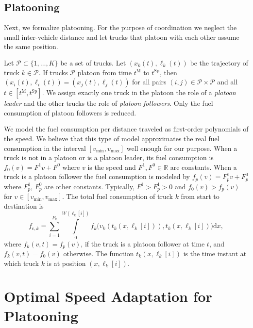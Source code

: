 \documentclass[letterpaper,10pt,conference,twocolumn]{IEEEtran}
\newcommand{\set}[1]{\mathcal{#1}}
\newcommand{\op}[1]{\mathrm{#1}}
\theoremstyle{definition}
\begin{document}
\subsection*{Platooning}

Next, we formalize platooning. For the purpose of coordination we neglect the small inter-vehicle distance and let trucks that platoon with each other assume the same position.

Let $\set{P} \subset \{1,\dots,K\}$ be a set of trucks. Let $(x_k(t),\ell_k(t))$ be the trajectory of truck $k \in \set{P}$. If trucks $\set{P}$ platoon from time $t^\op{M}$ to $t^\op{Sp}$, then $(x_i(t),\ell_i(t)) = (x_j(t),\ell_j(t))$ for all pairs $(i,j) \in \set{P}\times\set{P}$ and all $t \in [t^\op{M},t^\op{Sp}]$. 
We assign exactly one truck in the platoon the role of a \textit{platoon leader} and the other trucks the role of \textit{platoon followers}. Only the fuel consumption of platoon followers is reduced.

We model the fuel consumption per distance traveled as first-order polynomials of the speed.
We believe that this type of model approximates the real fuel consumption in the interval $[v_{\min}, v_{\max}]$ well enough for our purpose.
When a truck is not in a platoon or is a platoon leader, its fuel consumption is $f_0(v) = F^1 v + F^0$ where $v$ is the speed and $F^1, F^0 \in \mathbb{R}$ are constants. When a truck is a platoon follower the fuel consumption is modeled by $f_p(v) = F_p^1 v + F_p^0$ where $F_p^1$, $F_p^0$ are other constants. Typically, $F^1 > F_p^1 > 0$ and $f_0(v) > f_p(v)$ for $v \in [v_{\min}, v_{\max}]$.
The total fuel consumption of truck $k$ from start to destination is
\begin{equation}
 f_{\op{c},k} = \sum\limits_{i = 1}^{P_k} \int\limits_{0}^{W(\ell_k[i])} f_k\big(v_k(t_k(x,\ell_k[i])),t_k(x,\ell_k[i])\big) \op{d}x, \label{eq:fuel_consumption}
\end{equation}
where $f_k(v,t) = f_p(v)$, if the truck is a platoon follower at time $t$, and $f_k(v,t) = f_0(v)$ otherwise. The function $t_k(x,\ell_k[i])$ is the time instant at which truck $k$ is at position $(x,\ell_k[i])$. 


\section{Optimal Speed Adaptation for Platooning}
\label{sec:optimal_speed_adaption}
\end{document}
